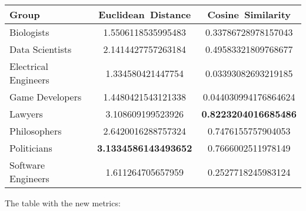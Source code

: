\begin{tabular}{lSS}
  \toprule
  {Group}              & {Euclidean\ Distance}                              & {Cosine\ Similarity}                               \\
  \midrule
  Biologists           & 1.5506118535995483                                 & 0.33786728978157043                                \\
  Data Scientists      & 2.1414427757263184                                 & 0.49583321809768677                                \\
  Electrical Engineers & 1.334580421447754                                  & 0.03393082693219185                                \\
  Game Developers      & 1.4480421543121338                                 & 0.044030994176864624                               \\
  Lawyers              & 3.108609199523926                                  &  \bfseries 0.8223204016685486 \\
  Philosophers         & 2.6420016288757324                                 & 0.7476155757904053                                 \\
  Politicians          &  \bfseries 3.1334586143493652 & 0.7666002511978149                                 \\
  Software Engineers   & 1.611264705657959                                  & 0.2527718245983124                                 \\
  \bottomrule
\end{tabular}

The table with the new metrics:

